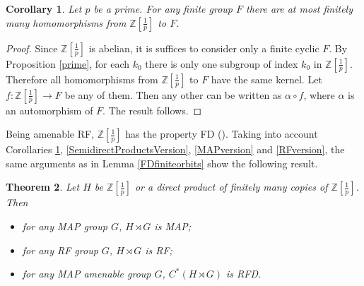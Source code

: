 \documentclass[11 pt, leqno, hidelinks]{amsart}%
\newtheorem{theorem}{Theorem}[section]
\theoremstyle{plain}
\newtheorem{corollary}[theorem]{Corollary}
\numberwithin{equation}{section}
\begin{document}
\begin{corollary}\label{CorPrime} Let $p$ be a prime.  For any finite group $F$ there are at most finitely many homomorphisms from $\mathbb Z[\frac{1}{p}]$ to $F$.
\end{corollary}
\begin{proof}  Since  $\mathbb Z[\frac{1}{p}]$ is abelian, it is suffices to consider only a finite cyclic $F$. By Proposition \ref{prime}, for each $k_0$  there is only one subgroup of index $k_0$ in  $\mathbb Z[\frac{1}{p}]$. Therefore all homomorphisms from $\mathbb Z[\frac{1}{p}]$ to $F$ have the same kernel. Let $f:\mathbb Z[\frac{1}{p}] \to F$  be any of them. Then any other can be written as $\alpha \circ f$, where $\alpha$ is an automorphism of $F$. The result follows.
\end{proof}

\medskip

\noindent Being amenable RF, $ \mathbb Z[\frac{1}{p}]$  has the property FD (\cite[Corollary 2.5]{LubotzkyShalom}).  Taking into account Corollaries \ref{CorPrime},  \ref{SemidirectProductsVersion}, \ref{MAPversion} and \ref{RFversion},  the same arguments as in Lemma \ref{FDfiniteorbits} show the following result.

\medskip







\begin{theorem}\label{Z1p} Let  $H$ be $\mathbb Z[\frac{1}{p}]$ or a direct product of  finitely many copies of $\mathbb Z[\frac{1}{p}]$. Then
 \begin{itemize}
\item [(i)]  for any MAP group $G$,  $H\rtimes G$ is MAP;

\item [(ii)]  for any RF group $G$,  $H\rtimes G$ is RF;

\item [(iii)] for any MAP amenable group $G$,  $C^*(H\rtimes G)$ is RFD.


\end{itemize}

\end{theorem}

\medskip
\end{document}
